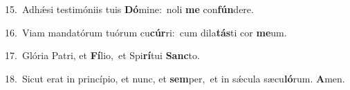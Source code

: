 {\numbfont\textcolor{\numbcolor}{15.}}~Adhǽsi testimóniis tuis \textbf{Dó}\-mine:~\star noli \textbf{me} con\-\textbf{fún}\-dere.\par
{\numbfont\textcolor{\numbcolor}{16.}}~Viam mandatórum tuórum cu\-\textbf{cúr}\-ri:~\star cum dila\-\textbf{tás}\-ti cor \textbf{me}\-um.\par
{\numbfont\textcolor{\numbcolor}{17.}}~Glória Patri, et \textbf{Fí}\-lio,~\star et Spi\-\textbf{rí}\-tui \textbf{Sanc}\-to.\par
{\numbfont\textcolor{\numbcolor}{18.}}~Sicut erat in princípio, et nunc, et \textbf{sem}\-per,~\star et in sǽcula sæcu\-\textbf{ló}\-rum. \textbf{A}\-men.\par
